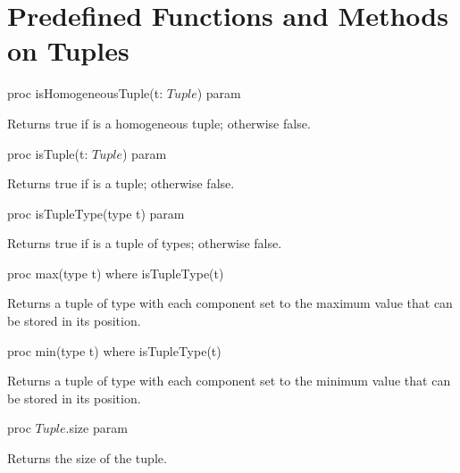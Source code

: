 \section{Predefined Functions and Methods on Tuples}
\label{Predefined_Functions_and_Methods_on_Tuples}

\begin{protohead}
proc isHomogeneousTuple(t: $Tuple$) param
\end{protohead}
\begin{protobody}
Returns true if  is a homogeneous tuple; otherwise false.
\end{protobody}

\begin{protohead}
proc isTuple(t: $Tuple$) param
\end{protohead}
\begin{protobody}
Returns true if  is a tuple; otherwise false.
\end{protobody}

\begin{protohead}
proc isTupleType(type t) param
\end{protohead}
\begin{protobody}
Returns true if  is a tuple of types; otherwise false.
\end{protobody}

\begin{protohead}
proc max(type t) where isTupleType(t)
\end{protohead}
\begin{protobody}
Returns a tuple of type  with each component set to the maximum
value that can be stored in its position.
\end{protobody}

\begin{protohead}
proc min(type t) where isTupleType(t)
\end{protohead}
\begin{protobody}
Returns a tuple of type  with each component set to the minimum
value that can be stored in its position.
\end{protobody}

\begin{protohead}
proc $Tuple$.size param
\end{protohead}
\begin{protobody}
Returns the size of the tuple.
\end{protobody}
